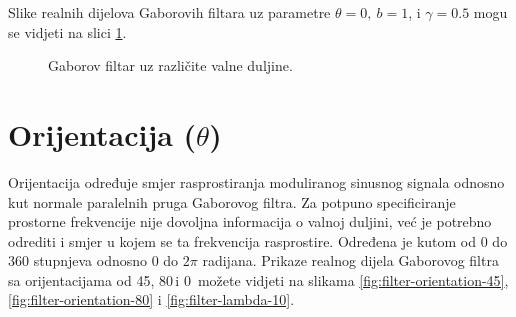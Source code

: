 \documentclass[12pt,a4paper]{ReportAA}
\begin{document}
Slike realnih dijelova Gaborovih filtara uz parametre $\theta = 0,\: b
= 1$, i $\gamma = 0.5$ mogu se vidjeti na slici \ref{fig:filter-wavelengths}.

\begin{figure}[h!tb]
\centering
{}
\hspace{50pt}
\caption{Gaborov filtar uz različite valne duljine.}
\label{fig:filter-wavelengths}
\end{figure}



\section{Orijentacija ($\theta$)}
Orijentacija određuje smjer rasprostiranja moduliranog sinusnog signala odnosno
kut normale paralelnih pruga Gaborovog filtra. Za potpuno
specificiranje prostorne frekvencije nije dovoljna informacija o valnoj
duljini, već je potrebno odrediti i smjer u kojem se ta frekvencija
rasprostire. Određena je kutom od $0$ do $360$ stupnjeva odnosno $0$ do $2\pi$
radijana. Prikaze realnog dijela Gaborovog filtra sa orijentacijama od
45\textdegree, 80\textdegree\,i 0\textdegree\, možete vidjeti na slikama
\ref{fig:filter-orientation-45}, \ref{fig:filter-orientation-80} i \ref{fig:filter-lambda-10}.
\end{document}
